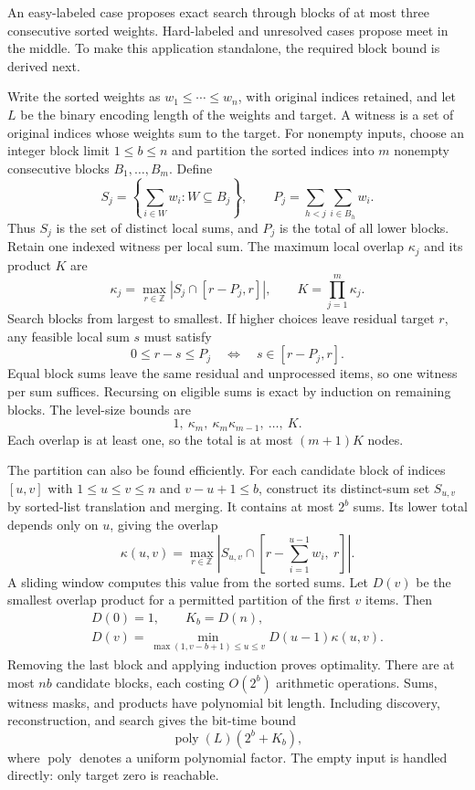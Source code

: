 \documentclass[10pt,letterpaper]{article}
\newcommand{\poly}{\operatorname{poly}}
\begin{document}
An easy-labeled case proposes exact search through blocks of at most three consecutive sorted weights. Hard-labeled and unresolved cases propose meet in the middle. To make this application standalone, the required block bound is derived next.

Write the sorted weights as $w_1\le\cdots\le w_n$, with original indices retained, and let $L$ be the binary encoding length of the weights and target. A witness is a set of original indices whose weights sum to the target. For nonempty inputs, choose an integer block limit $1\le b\le n$ and partition the sorted indices into $m$ nonempty consecutive blocks $B_1,\ldots,B_m$. Define
\[
 S_j=\left\{\sum_{i\in W}w_i:W\subseteq B_j\right\},\qquad
 P_j=\sum_{h<j}\sum_{i\in B_h}w_i.
\]
Thus $S_j$ is the set of distinct local sums, and $P_j$ is the total of all lower blocks. Retain one indexed witness per local sum. The maximum local overlap $\kappa_j$ and its product $K$ are
\begin{equation}\label{eq:overlap}
 \kappa_j=\max_{r\in\mathbb Z}|S_j\cap[r-P_j,r]|,\qquad K=\prod_{j=1}^m\kappa_j.
\end{equation}
Search blocks from largest to smallest. If higher choices leave residual target $r$, any feasible local sum $s$ must satisfy
\[
 0\le r-s\le P_j\quad\Longleftrightarrow\quad s\in[r-P_j,r].
\]
Equal block sums leave the same residual and unprocessed items, so one witness per sum suffices. Recursing on eligible sums is exact by induction on remaining blocks. The level-size bounds are
\[
 1,\ \kappa_m,\ \kappa_m\kappa_{m-1},\ \ldots,\ K.
\]
Each overlap is at least one, so the total is at most $(m+1)K$ nodes.

The partition can also be found efficiently. For each candidate block of indices $[u,v]$ with $1\le u\le v\le n$ and $v-u+1\le b$, construct its distinct-sum set $S_{u,v}$ by sorted-list translation and merging. It contains at most $2^b$ sums. Its lower total depends only on $u$, giving the overlap
\[
 \kappa(u,v)=\max_{r\in\mathbb Z}
 \left|S_{u,v}\cap\left[r-\sum_{i=1}^{u-1}w_i,\ r\right]\right|.
\]
A sliding window computes this value from the sorted sums. Let $D(v)$ be the smallest overlap product for a permitted partition of the first $v$ items. Then
\begin{equation}
 \begin{gathered}
 D(0)=1,\qquad K_b=D(n),\\[3pt]
 D(v)=\min_{\max(1,v-b+1)\le u\le v}D(u-1)\kappa(u,v).
 \end{gathered}
\end{equation}
Removing the last block and applying induction proves optimality. There are at most $nb$ candidate blocks, each costing $O(2^b)$ arithmetic operations. Sums, witness masks, and products have polynomial bit length. Including discovery, reconstruction, and search gives the bit-time bound
\[
 \poly(L)(2^b+K_b),
\]
where $\poly$ denotes a uniform polynomial factor. The empty input is handled directly: only target zero is reachable.
\end{document}
